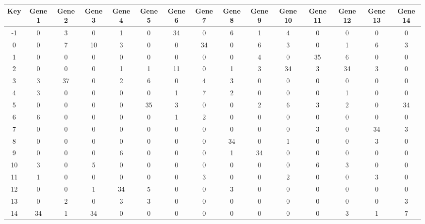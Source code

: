 \begin{tabular}{|c|c|c|c|c|c|c|c|c|c|c|c|c|c|c|}
\hline
Key & Gene 1 & Gene 2 & Gene 3 & Gene 4 & Gene 5 & Gene 6 & Gene 7 & Gene 8 & Gene 9 & Gene 10 & Gene 11 & Gene 12 & Gene 13 & Gene 14 \\
\hline
-1 & 0 & 3 & 0 & 1 & 0 & 34 & 0 & 6 & 1 & 4 & 0 & 0 & 0 & 0 \\
0 & 0 & 7 & 10 & 3 & 0 & 0 & 34 & 0 & 6 & 3 & 0 & 1 & 6 & 3 \\
1 & 0 & 0 & 0 & 0 & 0 & 0 & 0 & 0 & 4 & 0 & 35 & 6 & 0 & 0 \\
2 & 0 & 0 & 0 & 1 & 1 & 11 & 0 & 1 & 3 & 34 & 3 & 34 & 3 & 0 \\
3 & 3 & 37 & 0 & 2 & 6 & 0 & 4 & 3 & 0 & 0 & 0 & 0 & 0 & 0 \\
4 & 3 & 0 & 0 & 0 & 0 & 1 & 7 & 2 & 0 & 0 & 0 & 1 & 0 & 0 \\
5 & 0 & 0 & 0 & 0 & 35 & 3 & 0 & 0 & 2 & 6 & 3 & 2 & 0 & 34 \\
6 & 6 & 0 & 0 & 0 & 0 & 1 & 2 & 0 & 0 & 0 & 0 & 0 & 0 & 0 \\
7 & 0 & 0 & 0 & 0 & 0 & 0 & 0 & 0 & 0 & 0 & 3 & 0 & 34 & 3 \\
8 & 0 & 0 & 0 & 0 & 0 & 0 & 0 & 34 & 0 & 1 & 0 & 0 & 3 & 0 \\
9 & 0 & 0 & 0 & 6 & 0 & 0 & 0 & 1 & 34 & 0 & 0 & 0 & 0 & 0 \\
10 & 3 & 0 & 5 & 0 & 0 & 0 & 0 & 0 & 0 & 0 & 6 & 3 & 0 & 0 \\
11 & 1 & 0 & 0 & 0 & 0 & 0 & 3 & 0 & 0 & 2 & 0 & 0 & 3 & 0 \\
12 & 0 & 0 & 1 & 34 & 5 & 0 & 0 & 3 & 0 & 0 & 0 & 0 & 0 & 0 \\
13 & 0 & 2 & 0 & 3 & 3 & 0 & 0 & 0 & 0 & 0 & 0 & 0 & 0 & 3 \\
14 & 34 & 1 & 34 & 0 & 0 & 0 & 0 & 0 & 0 & 0 & 0 & 3 & 1 & 7 \\
\hline
\end{tabular}